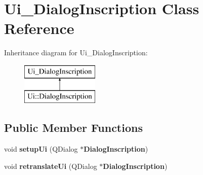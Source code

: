 \section{Ui\-\_\-\-Dialog\-Inscription Class Reference}
\label{class_ui___dialog_inscription}
Inheritance diagram for Ui\-\_\-\-Dialog\-Inscription\-:\begin{figure}[H]
\begin{center}
\leavevmode
\includegraphics[height=2.000000cm]{class_ui___dialog_inscription}
\end{center}
\end{figure}
\subsection*{Public Member Functions}
\begin{DoxyCompactItemize}
\item 
void {\bfseries setup\-Ui} (Q\-Dialog $\ast${\bf Dialog\-Inscription})\label{class_ui___dialog_inscription_aac8f38192f3e2691f410ae201df0d742}

\item 
void {\bfseries retranslate\-Ui} (Q\-Dialog $\ast${\bf Dialog\-Inscription})\label{class_ui___dialog_inscription_ae1af8d7775047088b4a14746e457b66e}

\end{DoxyCompactItemize}
